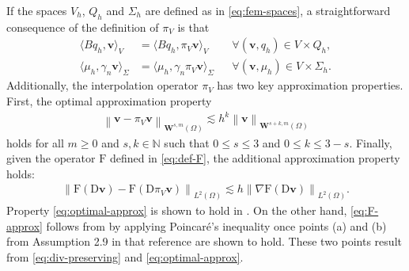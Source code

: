 \documentclass[onefignum,onetabnum]{siamart190516}
\newcommand{\NN}{\mathbb{N}}
\newcommand{\bv}{\boldsymbol{v}}
\newcommand{\bW}{\boldsymbol{W}}
\newcommand{\bD}{\boldsymbol{\mathrm{D}}}
\newcommand{\bF}{\boldsymbol{\mathrm{F}}}
\newcommand{\nrm}[1]{\left\lVert#1\right\rVert}
\begin{document}
If the spaces $V_h$, $Q_h$ and $\Sigma_h$ are defined as in \eqref{eq:fem-spaces}, a straightforward consequence of the definition of $\pi_V$ is that
%
\begin{align}
	\langle Bq_h, \bv \rangle_V &= \langle Bq_h, \pi_V \bv \rangle_V && \forall (\bv,q_h)\in V\times Q_h,\label{eq:div-preserving}\\
	\langle \mu_h, \gamma_n\bv \rangle_\Sigma &= \langle \mu_h, \gamma_n \pi_V \bv \rangle_\Sigma && \forall (\bv,\mu_h)\in V\times \Sigma_h. \label{eq:K-preserving}
\end{align}
%
Additionally, the interpolation operator $\pi_V$ has two key approximation properties. First, the optimal approximation property
%
\begin{align}\label{eq:optimal-approx}
	\nrm{\bv - \pi_V\bv}_{\bW^{s,m}(\Omega)} \lesssim h^k \nrm{\bv}_{\bW^{s+k,m}(\Omega)}
\end{align}
%
holds for all $m\geq 0$ and $s,k\in\NN$ such that $0 \leq s \leq 3$ and $0\leq k \leq 3-s$. Finally, given the operator $\bF$ defined in \eqref{eq:def-F}, the additional approximation property holds:
%
\begin{align}\label{eq:F-approx}
	\nrm{\bF(\bD\bv) - \bF(\bD\pi_V\bv)}_{L^2(\Omega)} \lesssim h \nrm{\nabla\bF(\bD\bv)}_{L^2(\Omega)}.
\end{align}
%
Property \eqref{eq:optimal-approx} is shown to hold in \cite{girault2003}. On the other hand, \eqref{eq:F-approx} follows from \cite[Theorem 3.4]{belenki2012} by applying Poincar\'e's inequality once points (a) and (b) from Assumption 2.9 in that reference are shown to hold. These two points result from \eqref{eq:div-preserving} and \eqref{eq:optimal-approx}.
\end{document}
